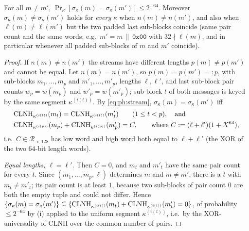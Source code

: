 \begin{lemma}\label{lem:ph:stream}
For all $m\ne m'$,
$\Pr_\kappa[\sigma_\kappa(m)=\sigma_\kappa(m')]\le2^{-64}$.
Moreover $\sigma_\kappa(m)\ne\sigma_\kappa(m')$ holds for \emph{every}
$\kappa$ when $n(m)\ne n(m')$, and also when $\ell(m)\ne\ell(m')$ but the two
padded last sub-blocks coincide (same pair count and the same words;
e.g.\ $m'=m\,\|\,\texttt{0x00}$ with $32\nmid\ell(m)$, and in particular
whenever all padded sub-blocks of $m$ and $m'$ coincide).
\end{lemma}
\begin{proof}
If $n(m)\ne n(m')$ the streams have different lengths $p(m)\ne p(m')$ and
cannot be equal.  Let $n(m)=n(m')$, so $p(m)=p(m')=:p$, with sub-blocks
$m_1,\dots,m_p$ and $m'_1,\dots,m'_p$, lengths $\ell,\ell'$, and last
sub-block pair counts $w_p=w(m_p)$ and $w'_p=w(m'_p)$; sub-block $t$ of both
messages is keyed by the same segment $\kappa^{(i(t))}$.  By
\eqref{eq:ph:stream}, $\sigma_\kappa(m)=\sigma_\kappa(m')$ iff
\begin{equation}\label{eq:ph:stream-eq}
\begin{aligned}
  &\mathrm{CLNH}_{\kappa^{(i(t))}}(m_t)=\mathrm{CLNH}_{\kappa^{(i(t))}}(m'_t)\qquad(1\le t<p),\quad\text{and}\\
  &\mathrm{CLNH}_{\kappa^{(i(p))}}(m_p)+\mathrm{CLNH}_{\kappa^{(i(p))}}(m'_p)=C,\qquad\text{where } C:=(\ell+\ell')(1+X^{64}) ,
\end{aligned}
\end{equation}
i.e.\ $C\in\mathcal R_{<128}$ has low word and high word both equal to
$\ell+\ell'$ (the XOR of the two $64$-bit length words).

\emph{Equal lengths, $\ell=\ell'$.}  Then $C=0$, and $m_t$ and $m'_t$ have
the same pair count for every $t$.  Since $(m_1,\dots,m_p,\ell)$ determines
$m$ and $m\ne m'$, there is a $t$ with $m_t\ne m'_t$; its pair count is at
least $1$, because two sub-blocks of pair count $0$ are both the empty tuple
and could not differ.  Hence
$\{\sigma_\kappa(m)=\sigma_\kappa(m')\}\subseteq\{\mathrm{CLNH}_{\kappa^{(i(t))}}(m_t)+\mathrm{CLNH}_{\kappa^{(i(t))}}(m'_t)=0\}$,
of probability $\le2^{-64}$ by (i) applied to the uniform
segment $\kappa^{(i(t))}$, i.e.\ by the XOR-universality of CLNH over the
common number of pairs.


\end{proof}
